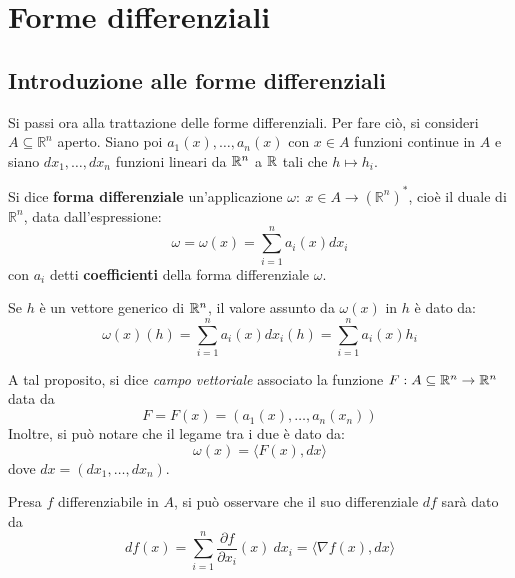 \chapter{Forme differenziali}
\section{Introduzione alle forme differenziali}
Si passi ora alla trattazione delle forme differenziali.
Per fare ciò, si consideri $A \subseteq \mathbb{R}^n$ aperto. Siano poi $a_1(x), \dots, a_n(x)$ con $x \in A$ funzioni continue in $A$ e siano $dx_1, \dots, dx_n$ funzioni lineari da $\mathbb{R}^n$ a $\mathbb{R}$ tali che $h \mapsto h_i$.
\begin{definition} \label{Def: Forma differenziale}
Si dice \textbf{forma differenziale} un'applicazione $\omega:\ x \in A \to  (\mathbb{R}^n)^*$, cioè il duale di $\mathbb{R}^n$, data dall'espressione:
\begin{equation}
    \omega= \omega(x)= \sum\limits_{i=1}^{n}{a_i(x)dx_i}
\end{equation}
con $a_i$ detti \textbf{coefficienti} della forma differenziale $\omega$.
\end{definition}
\begin{oss}
    Se $h$ è un vettore generico di $\mathbb{R}^n$, il valore assunto da $\omega(x)$ in $h$ è dato da:
    \begin{equation}
        \omega(x)(h)=\sum\limits_{i=1}^{n}{a_i(x)dx_i(h)}= \sum\limits_{i=1}^{n}{a_i(x)h_i}
    \end{equation}
\end{oss}
\begin{oss}
A tal proposito, si dice \textit{campo vettoriale} associato la funzione $F: A\subseteq \mathbb{R}^n \to \mathbb{R}^n$ data da
\begin{equation}
    F=F(x)=(a_1(x), \dots, a_n(x_n))
\end{equation}
Inoltre, si può notare che il legame tra i due è dato da:
\begin{equation} \label{Eq: Campo vettoriale}
    \omega(x)= \langle F(x), dx \rangle
\end{equation}
dove $dx= (dx_1,\dots, dx_n)$.
\end{oss}
\begin{oss}
Presa $f$ differenziabile in $A$, si può osservare che il suo differenziale $df$ sarà dato da
\begin{equation} \label{Eq: Differenziale}
    df(x)= \sum\limits_{i=1}^{n}{\frac{\partial f}{\partial x_i}(x)\ dx_i}= \langle \nabla f(x), dx\rangle
\end{equation}
\end{oss}
